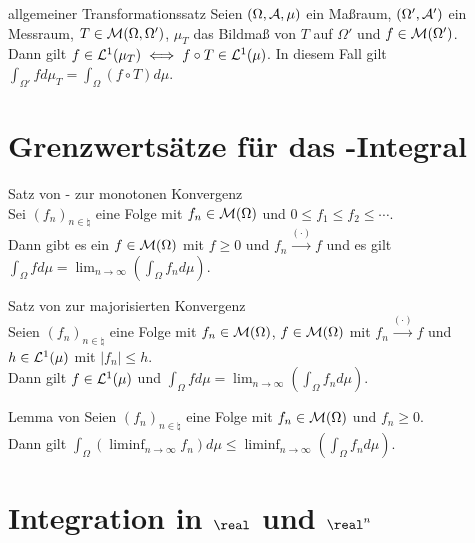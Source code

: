 \begin{Satz}{allgemeiner Transformationssatz}
    Seien $(\Omega, \mathcal{A}, \mu)$ ein Maßraum, $(\Omega', \mathcal{A}')$ ein Messraum,
    $T \in \mathcal{M}(\Omega, \Omega')$, $\mu_T$ das Bildmaß von $T$ auf $\Omega'$ und
    $f \in \mathcal{M}(\Omega')$.\\
    Dann gilt $f \in \mathcal{L}^1(\mu_T) \iff f \circ T \in \mathcal{L}^1(\mu)$.
    In diesem Fall gilt $\int_{\Omega'} f d\mu_T = \int_\Omega (f \circ T) d\mu$.
\end{Satz}

\section{%
    Grenzwertsätze für das -Integral%
}

\begin{Satz}{Satz von - zur monotonen Konvergenz}\\
    Sei $(f_n)_{n \in \natural}$ eine Folge mit $f_n \in \mathcal{M}(\Omega)$ und
    $0 \le f_1 \le f_2 \le \dotsb$.\\
    Dann gibt es ein $f \in \mathcal{M}(\Omega)$ mit $f \ge 0$ und $f_n \xrightarrow{(\cdot)} f$
    und es gilt $\int_\Omega f d\mu = \lim_{n \to \infty} \left(\int_\Omega f_n d\mu\right)$.
\end{Satz}

\begin{Satz}{Satz von  zur majorisierten Konvergenz}\\
    Seien $(f_n)_{n \in \natural}$ eine Folge mit $f_n \in \mathcal{M}(\Omega)$,
    $f \in \mathcal{M}(\Omega)$ mit $f_n \xrightarrow{(\cdot)} f$ und
    $h \in \mathcal{L}^1(\mu)$ mit $|f_n| \le h$.\\
    Dann gilt $f \in \mathcal{L}^1(\mu)$ und
    $\int_\Omega f d\mu = \lim_{n \to \infty} \left(\int_\Omega f_n d\mu\right)$.
\end{Satz}

\begin{Lemma}{Lemma von }
    Seien $(f_n)_{n \in \natural}$ eine Folge mit $f_n \in \mathcal{M}(\Omega)$ und $f_n \ge 0$.\\
    Dann gilt $\int_\Omega (\liminf_{n \to \infty} f_n) d\mu \le
    \liminf_{n \to \infty} \left(\int_\Omega f_n d\mu\right)$.
\end{Lemma}

\pagebreak

\section{%
    Integration in \texorpdfstring{$\real$}{ℝ} und \texorpdfstring{$\real^n$}{ℝⁿ}%
}

